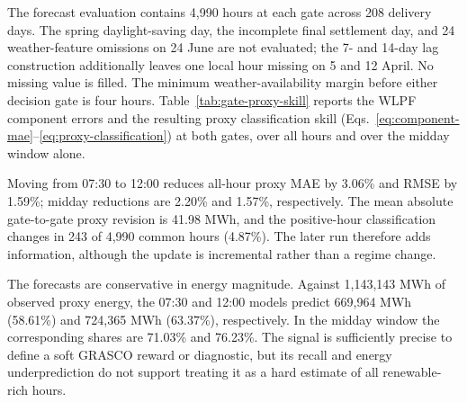 \documentclass[11pt,a4paper]{article}
\begin{document}
The forecast evaluation contains 4,990 hours at each gate across 208 delivery
days.  The spring daylight-saving day, the incomplete final settlement day,
and 24 weather-feature omissions on 24 June are not evaluated; the 7- and
14-day lag construction additionally leaves one local hour missing on 5 and
12 April.  No missing value is filled.  The minimum weather-availability
margin before either decision gate is four hours.
Table~\ref{tab:gate-proxy-skill} reports the WLPF component errors and the
resulting proxy classification skill (Eqs.~\eqref{eq:component-mae}--\eqref{eq:proxy-classification})
at both gates, over all hours and over the midday window alone.

\begin{table}[htbp]
  \centering
  \small
  \caption{Gate-available WLPF component and proxy forecast performance
  (authors' calculations from Energinet and ECMWF/Open-Meteo
  data~\cite{energineteds,openmeteo2026singleruns}).}
  \label{tab:gate-proxy-skill}
\end{table}

Moving from 07:30 to 12:00 reduces all-hour proxy MAE by 3.06\% and RMSE by
1.59\%; midday reductions are 2.20\% and 1.57\%, respectively.  The mean
absolute gate-to-gate proxy revision is 41.98 MWh, and the positive-hour
classification changes in 243 of 4,990 common hours (4.87\%).  The later run
therefore adds information, although the update is incremental rather than a
regime change.

The forecasts are conservative in energy magnitude.  Against 1,143,143 MWh of
observed proxy energy, the 07:30 and 12:00 models predict 669,964 MWh (58.61\%)
and 724,365 MWh (63.37\%), respectively.  In the midday window the corresponding
shares are 71.03\% and 76.23\%.  The signal is sufficiently precise to define a
soft GRASCO reward or diagnostic, but its recall and energy underprediction
do not support treating it as a hard estimate of all renewable-rich hours.
\end{document}
